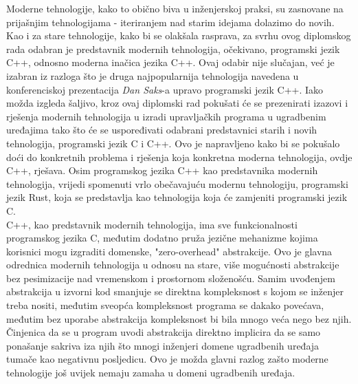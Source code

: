 Moderne tehnologije, kako to obično biva u inženjerskoj praksi, su zasnovane na prijašnjim tehnologijama - iteriranjem nad starim idejama dolazimo do novih. Kao i za stare tehnologije, kako bi se olakšala rasprava, za svrhu ovog diplomskog rada odabran je predstavnik modernih tehnologija, očekivano, programski jezik C++, odnosno moderna inačica jezika C++. Ovaj odabir nije slučajan, već je izabran iz razloga što je druga najpopularnija tehnologija navedena u konferenciskoj prezentacija \textit{Dan Saks}-a\cite{danSaksWritingBetterEmbeddedSoftware} upravo programski jezik C++. Iako možda izgleda šaljivo, kroz ovaj diplomski rad pokušati će se prezenirati izazovi i rješenja modernih tehnologija u izradi upravljačkih programa u ugradbenim uređajima tako što će se uspoređivati odabrani predstavnici starih i novih tehnologija, programski jezik C i C++. Ovo je napravljeno kako bi se pokušalo doći do konkretnih problema i rješenja koja konkretna moderna tehnologija, ovdje C++, rješava. Osim programskog jezika C++ kao predstavnika modernih tehnologija, vrijedi spomenuti vrlo obečavajuću modernu tehnologiju, programski jezik Rust, koja se predstavlja kao tehnologija koja će zamjeniti programski jezik C. \\
C++, kao predstavnik modernih tehnologija, ima sve funkcionalnosti programskog jezika C, međutim dodatno pruža jezične mehanizme kojima korisnici mogu izgraditi domenske, "zero-overhead" abstrakcije. Ovo je glavna odrednica modernih tehnologija u odnosu na stare, više mogućnosti abstrakcije bez pesimizacije nad vremenskom i prostornom složenošću. Samim uvođenjem abstrakcija u izvorni kod smanjuje se direktna kompleksnost s kojom se inženjer treba nositi, međutim sveopća kompleksnost programa se dakako povećava, međutim bez uporabe abstrakcija kompleksnost bi bila mnogo veća nego bez njih. Činjenica da se u program uvodi abstrakcija direktno implicira da se samo ponašanje sakriva iza njih što mnogi inženjeri domene ugradbenih uređaja tumače kao negativnu posljedicu. Ovo je možda glavni razlog zašto moderne tehnologije još uvijek nemaju zamaha u domeni ugradbenih uređaja.

